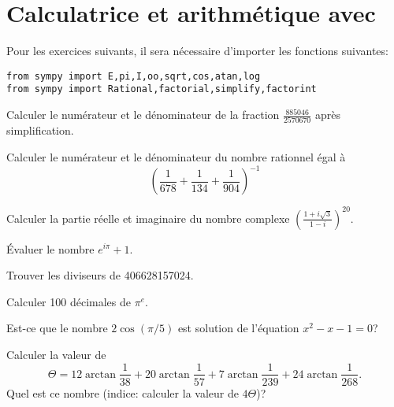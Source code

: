 
\section{Calculatrice et arithmétique avec \sympy}

Pour les exercices suivants, il sera nécessaire d'importer les fonctions
suivantes:
\begin{verbatim}
from sympy import E,pi,I,oo,sqrt,cos,atan,log
from sympy import Rational,factorial,simplify,factorint
\end{verbatim}

\begin{exercice}
Calculer le numérateur et le dénominateur de la fraction 
$\displaystyle\frac{885046}{2570670}$ après simplification.
\end{exercice}

\begin{exercice}
Calculer le numérateur et le dénominateur du nombre rationnel égal à
\[
    \left(\frac{1}{678} + \frac{1}{134} + \frac{1}{904}\right)^{-1}
\]
\end{exercice}

\begin{exercice}
Calculer la partie réelle et imaginaire du nombre complexe
$\displaystyle\left(\frac{1+i\sqrt{3}}{1-i}\right)^{20}$.
\end{exercice}

\begin{exercice}
    Évaluer le nombre $e^{i\pi}+1$.
\end{exercice}

\begin{exercice}
    Trouver les diviseurs de 406628157024.
\end{exercice}

\begin{exercice}
Calculer 100 décimales de $\pi^e$.
\end{exercice}

\begin{exercice}
Est-ce que le nombre $2\cos(\pi/5)$ est solution de l'équation $x^2-x-1=0$?
\end{exercice}

\begin{exercice}
    Calculer la valeur de
    \[
	\Theta = 12\arctan\frac{1}{38}+
	         20\arctan\frac{1}{57}+
	          7\arctan\frac{1}{239}+
	      24\arctan\frac{1}{268}.
    \]
    Quel est ce nombre (indice: calculer la valeur de $4\Theta$)?
\end{exercice}


